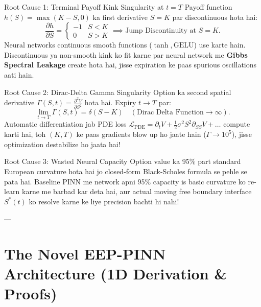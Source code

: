 \documentclass[11pt,a4paper,oneside]{book}
\begin{document}
\begin{auditbox}{Root Cause 1: Terminal Payoff Kink Singularity at $t=T$}
Payoff function $h(S) = \max(K-S, 0)$ ka first derivative $S = K$ par discontinuous hota hai:
\begin{equation}
    \frac{\partial h}{\partial S} = \begin{cases} -1 & S < K \\ 0 & S > K \end{cases} \implies \text{Jump Discontinuity at } S=K.
\end{equation}
Neural networks continuous smooth functions ($\tanh, \text{GELU}$) use karte hain. Discontinuous ya non-smooth kink ko fit karne par neural network me \textbf{Gibbs Spectral Leakage} create hota hai, jisse expiration ke paas spurious oscillations aati hain.
\end{auditbox}

\begin{auditbox}{Root Cause 2: Dirac-Delta Gamma Singularity}
Option ka second spatial derivative $\Gamma(S, t) = \frac{\partial^2 V}{\partial S^2}$ hota hai. Expiry $t \to T$ par:
\begin{equation}
    \lim_{t \to T} \Gamma(S, t) = \delta(S - K) \quad (\text{Dirac Delta Function} \to \infty).
\end{equation}
Automatic differentiation jab PDE loss $\mathcal{L}_{\text{PDE}} = \partial_t V + \frac{1}{2}\sigma^2 S^2 \partial_{SS} V + \dots$ compute karti hai, toh $(K, T)$ ke paas gradients blow up ho jaate hain ($\Gamma \to 10^5$), jisse optimization destabilize ho jaata hai!
\end{auditbox}

\begin{auditbox}{Root Cause 3: Wasted Neural Capacity}
Option value ka 95\% part standard European curvature hota hai jo closed-form Black-Scholes formula se pehle se pata hai. Baseline PINN me network apni 95\% capacity is basic curvature ko re-learn karne me barbad kar deta hai, aur actual moving free boundary interface $S^*(t)$ ko resolve karne ke liye precision bachti hi nahi!
\end{auditbox}

---

\chapter{The Novel EEP-PINN Architecture (1D Derivation \& Proofs)}
\end{document}
